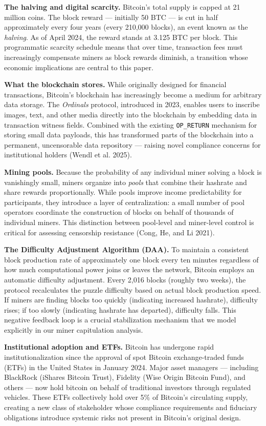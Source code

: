 \documentclass[
  11pt,
]{article}
\begin{document}
\textbf{The halving and digital scarcity.} Bitcoin's total supply is
capped at 21 million coins. The block reward --- initially 50 BTC --- is
cut in half approximately every four years (every 210,000 blocks), an
event known as the \emph{halving}. As of April 2024, the reward stands
at 3.125 BTC per block. This programmatic scarcity schedule means that
over time, transaction fees must increasingly compensate miners as block
rewards diminish, a transition whose economic implications are central
to this paper.

\textbf{What the blockchain stores.} While originally designed for
financial transactions, Bitcoin's blockchain has increasingly become a
medium for arbitrary data storage. The \emph{Ordinals} protocol,
introduced in 2023, enables users to inscribe images, text, and other
media directly into the blockchain by embedding data in transaction
witness fields. Combined with the existing \texttt{OP\_RETURN} mechanism
for storing small data payloads, this has transformed parts of the
blockchain into a permanent, uncensorable data repository --- raising
novel compliance concerns for institutional holders (Wendl et al. 2025).

\textbf{Mining pools.} Because the probability of any individual miner
solving a block is vanishingly small, miners organize into \emph{pools}
that combine their hashrate and share rewards proportionally. While
pools improve income predictability for participants, they introduce a
layer of centralization: a small number of pool operators coordinate the
construction of blocks on behalf of thousands of individual miners. This
distinction between pool-level and miner-level control is critical for
assessing censorship resistance (Cong, He, and Li 2021).

\textbf{The Difficulty Adjustment Algorithm (DAA).} To maintain a
consistent block production rate of approximately one block every ten
minutes regardless of how much computational power joins or leaves the
network, Bitcoin employs an automatic difficulty adjustment. Every 2,016
blocks (roughly two weeks), the protocol recalculates the puzzle
difficulty based on actual block production speed. If miners are finding
blocks too quickly (indicating increased hashrate), difficulty rises; if
too slowly (indicating hashrate has departed), difficulty falls. This
negative feedback loop is a crucial stabilization mechanism that we
model explicitly in our miner capitulation analysis.

\textbf{Institutional adoption and ETFs.} Bitcoin has undergone rapid
institutionalization since the approval of spot Bitcoin exchange-traded
funds (ETFs) in the United States in January 2024. Major asset managers
--- including BlackRock (iShares Bitcoin Trust), Fidelity (Wise Origin
Bitcoin Fund), and others --- now hold bitcoin on behalf of traditional
investors through regulated vehicles. These ETFs collectively hold over
5\% of Bitcoin's circulating supply, creating a new class of stakeholder
whose compliance requirements and fiduciary obligations introduce
systemic risks not present in Bitcoin's original design.
\end{document}
